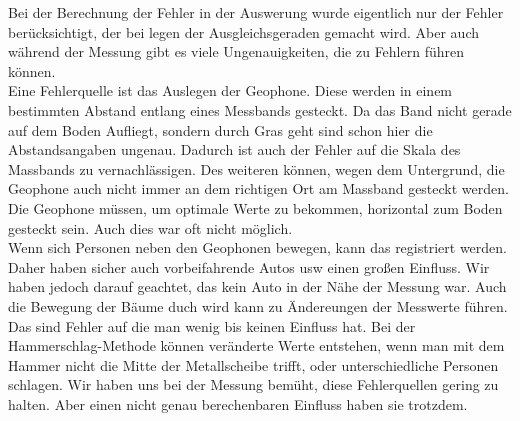Bei der Berechnung der Fehler in der Auswerung wurde eigentlich nur der Fehler berücksichtigt, der bei legen der Ausgleichsgeraden gemacht wird. Aber auch während der Messung gibt es viele Ungenauigkeiten, die zu Fehlern führen können. \\
Eine Fehlerquelle ist das Auslegen der Geophone. Diese werden in einem bestimmten Abstand entlang eines Messbands gesteckt. Da das Band nicht gerade auf dem Boden Aufliegt, sondern durch Gras geht sind schon hier die Abstandsangaben ungenau. Dadurch ist auch der Fehler auf die Skala des Massbands zu vernachlässigen. Des weiteren können, wegen dem Untergrund, die Geophone auch nicht immer an dem richtigen Ort am Massband gesteckt werden. Die Geophone müssen, um optimale Werte zu bekommen, horizontal zum Boden gesteckt sein. Auch dies war oft nicht möglich.\\
Wenn sich Personen neben den Geophonen bewegen, kann das registriert werden. Daher haben sicher auch vorbeifahrende Autos usw einen großen Einfluss. Wir haben jedoch darauf geachtet, das kein Auto in der Nähe der Messung war. Auch die Bewegung der Bäume duch wird kann zu Ändereungen der Messwerte führen. Das sind Fehler auf die man wenig bis keinen Einfluss hat. 
Bei der Hammerschlag-Methode können veränderte Werte entstehen, wenn man mit dem Hammer nicht die Mitte der Metallscheibe trifft, oder unterschiedliche Personen schlagen. 
Wir haben uns bei der Messung bemüht, diese Fehlerquellen gering zu halten. Aber einen nicht genau berechenbaren Einfluss haben sie trotzdem.